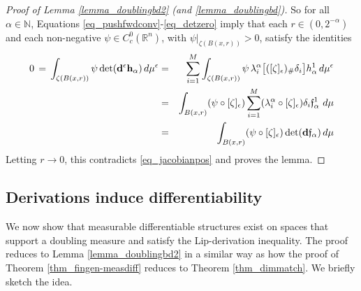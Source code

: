 \documentclass[reqno]{amsart}
\theoremstyle{plain}
\theoremstyle{definition}
\theoremstyle{remark}
\numberwithin{equation}{section}
\renewcommand{\a}{\alpha}
\renewcommand{\d}{\delta}
\newcommand{\e}{\epsilon}
\newcommand{\f}{\mathfrak{f}}
\newcommand{\N}{\mathbb{N}}
\newcommand{\R}{\mathbb{R}}
\begin{document}
\begin{proof}[Proof of Lemma \ref{lemma_doublingbd2} (and \ref{lemma_doublingbd})]
So for all $\a \in \N$, Equations \eqref{eq_pushfwdconv}-\eqref{eq_detzero} imply that each $r \in (0,2^{-\a})$ and each non-negative $\psi \in C^0_c(\R^n)$, with $\psi|_{\zeta(B(x,r))} > 0$, satisfy the identities
\begin{eqnarray*}
0 \,=\,
\int_{\zeta(B(x,r))} \psi \det({\bf d}^\e{\bf h}_\a) \,d\mu^\e &=&
\sum_{i=1}^M \int_{\zeta(B(x,r))} \psi \, \lambda_i^\a \big[([\zeta]_\e)_\#\d_i\big]h_\a^1 \,d\mu^\e \\ &=&
\int_{B(x,r)} (\psi \circ [\zeta]_\e) \sum_{i=1}^M (\lambda_i^\a \circ [\zeta]_\e) \d_i\f_\a^1 \, \,d\mu \\ &=&
\int_{B(x,r)} (\psi \circ [\zeta]_\e) \det({\bf d}\f_\a) \,d\mu
\end{eqnarray*}
Letting $r \to 0$, this contradicts \eqref{eq_jacobianpos} and proves the lemma.
\end{proof}



\subsection{Derivations induce differentiability}

We now show that measurable differentiable structures exist on spaces that support a doubling measure and satisfy the Lip-derivation inequality.  The proof reduces to Lemma \ref{lemma_doublingbd2} in a similar way as how the proof of Theorem \ref{thm_fingen-measdiff} reduces to Theorem \ref{thm_dimmatch}.  We briefly sketch the idea.
\end{document}
